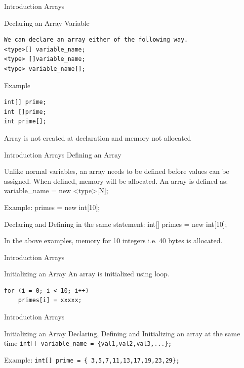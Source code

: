 \documentclass[14pt]{beamer}
\begin{document}
\begin{frame}[fragile]{Introduction Arrays}
\begin{block}{Declaring an Array Variable}
\begin{lstlisting}[numbers=none]
We can declare an array either of the following way.
<type>[] variable_name;
<type> []variable_name;
<type> variable_name[];
\end{lstlisting}
\end{block}
\begin{block}{Example}
\begin{lstlisting}[numbers=none]
int[] prime;
int []prime;
int prime[];
\end{lstlisting}
\end{block}
Array is not created at declaration and memory not allocated
\end{frame}

\begin{frame}{Introduction Arrays}
Defining  an Array

Unlike normal variables, an array needs to be defined before values can be assigned. When defined, memory will be allocated. An array is defined as:
variable\_name = new <type>[N];

Example: primes = new int[10];

Declaring and Defining in the same statement:
int[] primes = new int[10];

In the above examples, memory for 10 integers i.e. 40 bytes is allocated.
\end{frame}

\begin{frame}[fragile]{Introduction Arrays}
\begin{block}{Initializing an Array}
An array is initialized using loop.
\begin{lstlisting}[numbers=none]
for (i = 0; i < 10; i++)
    primes[i] = xxxxx;
\end{lstlisting}
\end{block}
\end{frame}

\begin{frame}[fragile]{Introduction Arrays}
\begin{block}{Initializing an Array}
Declaring, Defining and Initializing an array at the same time
\lstinline!int[] variable_name = {val1,val2,val3,...};!

Example: \lstinline!int[] prime = { 3,5,7,11,13,17,19,23,29};!

\end{block}
\end{frame}
\end{document}
